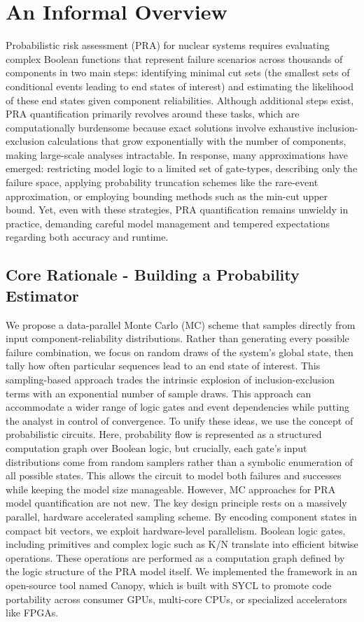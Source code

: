 \section*{An Informal Overview}
Probabilistic risk assessment (PRA) for nuclear systems requires evaluating complex Boolean functions that represent failure scenarios across thousands of components in two main steps: identifying minimal cut sets (the smallest sets of conditional events leading to end states of interest) and estimating the likelihood of these end states given component reliabilities. Although additional steps exist, PRA quantification primarily revolves around these tasks, which are computationally burdensome because exact solutions involve exhaustive inclusion-exclusion calculations that grow exponentially with the number of components, making large-scale analyses intractable. In response, many approximations have emerged: restricting model logic to a limited set of gate-types, describing only the failure space, applying probability truncation schemes like the rare-event approximation, or employing bounding methods such as the min-cut upper bound. Yet, even with these strategies, PRA quantification remains unwieldy in practice, demanding careful model management and tempered expectations regarding both accuracy and runtime.
\subsection*{Core Rationale - Building a Probability Estimator}
We propose a data-parallel Monte Carlo (MC) scheme that samples directly from input component-reliability distributions. Rather than generating every possible failure combination, we focus on random draws of the system’s global state, then tally how often particular sequences lead to an end state of interest. This sampling-based approach trades the intrinsic explosion of inclusion-exclusion terms with an exponential number of sample draws. This approach can accommodate a wider range of logic gates and event dependencies while putting the analyst in control of convergence. To unify these ideas, we use the concept of probabilistic circuits. Here, probability flow is represented as a structured computation graph over Boolean logic, but crucially, each gate’s input distributions come from random samplers rather than a symbolic enumeration of all possible states. This allows the circuit to model both failures and successes while keeping the model size manageable. However, MC approaches for PRA model quantification are not new. The key design principle rests on a massively parallel, hardware accelerated sampling scheme. By encoding component states in compact bit vectors, we exploit hardware-level parallelism. Boolean logic gates, including primitives and complex logic such as K/N translate into efficient bitwise operations. These operations are performed as a computation graph defined by the logic structure of the PRA model itself. We implemented the framework in an open-source tool named Canopy, which is built with SYCL to promote code portability across consumer GPUs, multi-core CPUs, or specialized accelerators like FPGAs.

